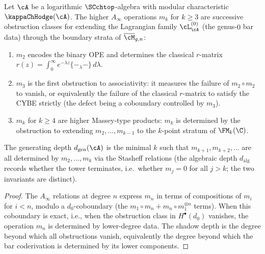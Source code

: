 \begin{theorem}
\label{thm:obstruction-interpretation}
Let $\cA$ be a logarithmic $\SCchtop$-algebra with modular characteristic $\kappaChHodge(\cA)$. The higher $A_\infty$ operations $m_k$ for $k \geq 3$ are successive obstruction classes for extending the Lagrangian family $\cL^{(0)}_\cA$ (the genus-$0$ bar data) through the boundary strata of $\overline{\cM}_{g,n}$:
\begin{enumerate}[label=\textup{(\roman*)}]
\item $m_2$ encodes the binary OPE and determines the classical $r$-matrix $r(z) = \int_0^\infty e^{-\lambda z} \{-{}_\lambda -\}\, d\lambda$.
\item $m_3$ is the first obstruction to associativity: it measures the failure of $m_2 \circ m_2$ to vanish, or equivalently the failure of the classical $r$-matrix to satisfy the CYBE strictly (the defect being a coboundary controlled by $m_3$).
\item $m_k$ for $k \geq 4$ are higher Massey-type products: $m_k$ is determined by the obstruction to extending $m_2, \ldots, m_{k-1}$ to the $k$-point stratum of $\FM_k(\C)$.
\end{enumerate}
The generating depth $d_{\mathrm{gen}}(\cA)$ is the minimal $k$ such that $m_{k+1}, m_{k+2}, \ldots$ are all determined by $m_2, \ldots, m_k$ via the Stasheff relations (the algebraic depth $d_{\mathrm{alg}}$ records whether the tower terminates, i.e.\ whether $m_j = 0$ for all $j > k$; the two invariants are distinct).
\end{theorem}

\begin{proof}
The $A_\infty$ relations at degree $n$ express $m_n$ in terms of compositions of $m_i$ for $i < n$, modulo a $d_0$-coboundary (the $m_1 \circ m_n + m_n \circ m_1^{\otimes n}$ terms). When this coboundary is exact, i.e., when the obstruction class in $H^\bullet(d_0)$ vanishes, the operation $m_n$ is determined by lower-degree data. The shadow depth is the degree beyond which all obstructions vanish, equivalently the degree beyond which the bar coderivation is determined by its lower components.
\end{proof}

